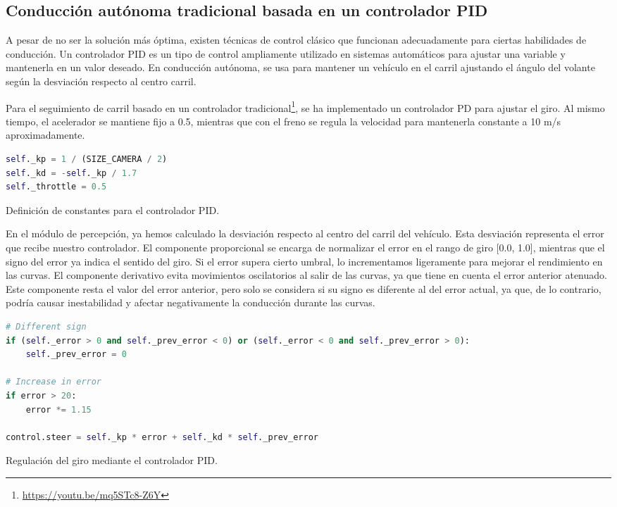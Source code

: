 \subsection{Conducción autónoma tradicional basada en un controlador \ac{PID}}

A pesar de no ser la solución más óptima, existen técnicas de control clásico que funcionan adecuadamente para ciertas habilidades de conducción. Un controlador \ac{PID} es un tipo de control ampliamente utilizado en sistemas automáticos para ajustar una variable y mantenerla en un valor deseado. En conducción autónoma, se usa para mantener un vehículo en el carril ajustando el ángulo del volante según la desviación respecto al centro carril.

Para el seguimiento de carril basado en un controlador tradicional\footnote{\url{https://youtu.be/mq5STc8-Z6Y}}, se ha implementado un controlador PD para ajustar el giro. Al mismo tiempo, el acelerador se mantiene fijo a 0.5, mientras que con el freno se regula la velocidad para mantenerla constante a 10 m/s aproximadamente.
\begin{code}[h]
\begin{lstlisting}[language=Python]
self._kp = 1 / (SIZE_CAMERA / 2)
self._kd = -self._kp / 1.7
self._throttle = 0.5
\end{lstlisting}
\caption[Definición de constantes para el controlador \ac{PID}]{Definición de constantes para el controlador \ac{PID}.}
\label{cod:const_pid}
\end{code}

En el módulo de percepción, ya hemos calculado la desviación respecto al centro del carril del vehículo. Esta desviación representa el error que recibe nuestro controlador. El componente proporcional se encarga de normalizar el error en el rango de giro [0.0, 1.0], mientras que el signo del error ya indica el sentido del giro. Si el error supera cierto umbral, lo incrementamos ligeramente para mejorar el rendimiento en las curvas. El componente derivativo evita movimientos oscilatorios al salir de las curvas, ya que tiene en cuenta el error anterior atenuado. Este componente resta el valor del error anterior, pero solo se considera si su signo es diferente al del error actual, ya que, de lo contrario, podría causar inestabilidad y afectar negativamente la conducción durante las curvas.

\begin{code}[h]
\begin{lstlisting}[language=Python]
# Different sign
if (self._error > 0 and self._prev_error < 0) or (self._error < 0 and self._prev_error > 0):
    self._prev_error = 0       

# Increase in error
if error > 20:
    error *= 1.15

control.steer = self._kp * error + self._kd * self._prev_error
\end{lstlisting}
\caption[Regulación del giro mediante el controlador \ac{PID}]{Regulación del giro mediante el controlador \ac{PID}.}
\label{cod:pid_giro}
\end{code}

